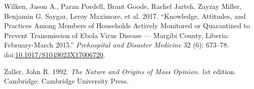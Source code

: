 \documentclass[]{article}
\begin{document}
\hypertarget{ref-wilken_knowledge_2017}{}
Wilken, Jason A., Paran Pordell, Brant Goode, Rachel Jarteh, Zayzay
Miller, Benjamin G. Saygar, Leroy Maximore, et al. 2017. ``Knowledge,
Attitudes, and Practices Among Members of Households Actively Monitored
or Quarantined to Prevent Transmission of Ebola Virus Disease ---
Margibi County, Liberia: February-March 2015.'' \emph{Prehospital and
Disaster Medicine} 32 (6): 673--78.
doi:\href{https://doi.org/10.1017/S1049023X17006720}{10.1017/S1049023X17006720}.

\hypertarget{ref-zaller_nature_1992}{}
Zaller, John R. 1992. \emph{The Nature and Origins of Mass Opinion}. 1st
edition. Cambridge: Cambridge University Press.
\end{document}
